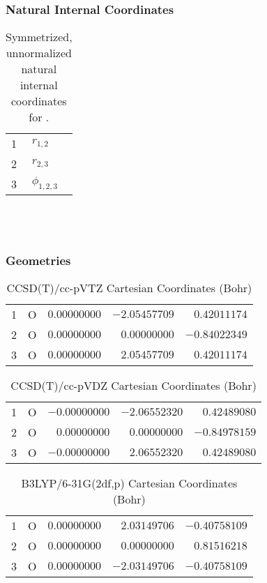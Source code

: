 \documentclass[10pt,oneside]{article}
\begin{document}
\clearpage

\subsubsection*{Natural Internal Coordinates}
\begin{table}[h!]
\centering
\caption{Symmetrized, unnormalized natural internal coordinates for .}
\small
\begin{tabular}{ll}
  1   & $r_{1,2}$ \\
  2   & $r_{2,3}$ \\
  3   & $\phi_{1,2,3}$ \\
\end{tabular}
\end{table}

\clearpage

\subsection{\ \ \ }

\subsubsection*{Geometries}
\begin{table}[h!]
\centering
\caption{CCSD(T)/cc-pVTZ Cartesian Coordinates (Bohr)}
\begin{tabular}{llrrr}
1  & O  & $ 0.00000000$ & $-2.05457709$ & $ 0.42011174$ \\
2  & O  & $ 0.00000000$ & $ 0.00000000$ & $-0.84022349$ \\
3  & O  & $ 0.00000000$ & $ 2.05457709$ & $ 0.42011174$ \\
\end{tabular}
\end{table}

\begin{table}[h!]
\centering
\caption{CCSD(T)/cc-pVDZ Cartesian Coordinates (Bohr)}
\begin{tabular}{llrrr}
1  & O  & $-0.00000000$ & $-2.06552320$ & $ 0.42489080$ \\
2  & O  & $ 0.00000000$ & $ 0.00000000$ & $-0.84978159$ \\
3  & O  & $-0.00000000$ & $ 2.06552320$ & $ 0.42489080$ \\
\end{tabular}
\end{table}

\begin{table}[h!]
\centering
\caption{B3LYP/6-31G(2df,p) Cartesian Coordinates (Bohr)}
\begin{tabular}{llrrr}
1  & O  & $ 0.00000000$ & $ 2.03149706$ & $-0.40758109$ \\
2  & O  & $ 0.00000000$ & $ 0.00000000$ & $ 0.81516218$ \\
3  & O  & $ 0.00000000$ & $-2.03149706$ & $-0.40758109$ \\
\end{tabular}
\end{table}
\end{document}
